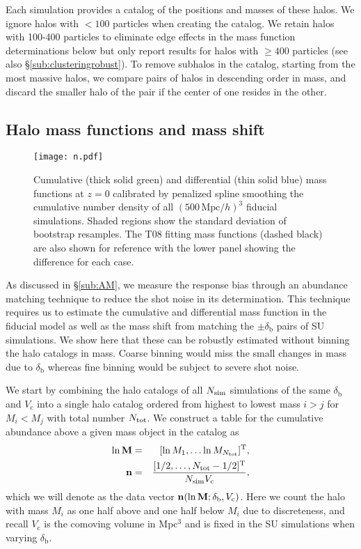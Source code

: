 \documentclass[prd,twocolumn,amsmath,amssymb,floatfix,superscriptaddress]{revtex4-1}
\newcommand{\br}{\textrm{b}}
\newcommand{\VL}{V_\textrm{c}}
\begin{document}
Each simulation provides a catalog of the positions and masses of these halos.
We ignore halos with $<100$ particles when creating the catalog.  
We retain halos with 100-400 particles to eliminate edge effects in the mass function determinations
below but only report results
for halos with $\geq400$ particles \cite{TinkerKravEtAl08} (see also \S \ref{sub:clusteringrobust}).
To remove subhalos in the catalog, starting from the most massive halos,
we compare pairs of halos in descending order in mass, and discard the smaller halo of the pair
if the center of one resides in the other.




\subsection{Halo mass functions and mass shift}
\label{sub:calibration}

\begin{figure}[tb]
    \centering
    \texttt{[image: n.pdf]}
    \caption{\footnotesize 
        Cumulative (thick solid green) and differential (thin solid blue) mass functions at $z=0$
        calibrated by penalized spline smoothing the cumulative number density of all
        $(500\,\textrm{Mpc}/h)^3$ fiducial simulations.
        Shaded regions show the standard deviation of bootstrap resamples.
        The T08 fitting mass functions \cite{TinkerKravEtAl08} (dashed black)
        are also shown for reference with the lower panel
        showing the difference for each case.
    }
    \label{fig:n}
\end{figure}

As discussed in \S \ref{sub:AM}, we measure the response bias through an abundance matching 
technique to reduce the shot noise in its determination.  This technique requires us to estimate
the cumulative and differential mass function in the fiducial model as well as the mass shift from 
matching the $\pm \delta_\br$ pairs of SU simulations.  We show here that these can be robustly estimated
without binning the halo catalogs in mass.
Coarse binning would miss
the small changes in  mass due to $\delta_\br$ whereas fine binning would be subject
to severe shot noise.
 


We start by combining the halo catalogs of all $N_{\rm sim}$ simulations of the same $\delta_\br$ and
$\VL$ into a single halo catalog ordered from highest to lowest mass $i>j$
for $M_i < M_j$ with total number $N_{\rm tot}$.  
We construct a table for the cumulative
abundance above a given mass object in the catalog as
\begin{eqnarray}
    \ln{\bf M} &=& [\ln M_1, \ldots \ln M_{N_{\rm tot}}]^\mathrm{T}, \nonumber\\
    {\bf n} &=& \frac{[1/2, \ldots, N_{\rm tot}-1/2]^\mathrm{T}}{N_{\rm sim}\VL},
    \label{eqn:n_data}
\end{eqnarray}
which we will denote as the data vector ${\bf n}(\ln {\bf M};\delta_\br,\VL)$.  Here 
we count the halo with mass $M_i$ as one half above and one half below $M_i$ due to discreteness,
and recall $\VL$ is the comoving volume in Mpc$^3$ and is fixed in the SU simulations
when varying $\delta_\br$.
\end{document}
